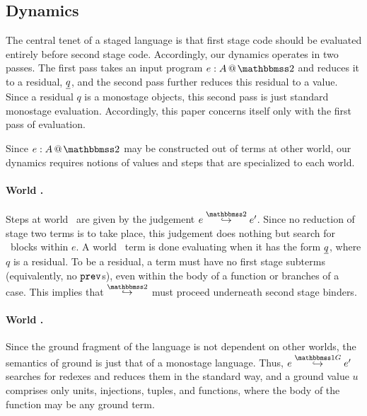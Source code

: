 \subsection{Dynamics}
\label{sec:dynamics}



The central tenet of a staged language
is that first stage code should be evaluated entirely before second stage code.
Accordingly, our dynamics operates in two passes.
The first pass takes an input program $\coltwo e A$ and reduces it to a residual,
$\underline{q}$, and the second pass further reduces this residual to a value.
Since a residual $q$ is a monostage objects, this second pass is just standard monostage evaluation.
Accordingly, this paper concerns itself only with the first pass of evaluation.

Since $\coltwo e A$ may be constructed out of terms at other world, 
our dynamics requires notions of values and steps that are specialized to each world.

\paragraph{World \bbtwo.} Steps at world \bbtwo\ are given by the judgement $\steptwo e {e'}$.
Since no reduction of stage two terms is to take place, this judgement does nothing but search for \prev\ blocks within $e$.
A world \bbtwo\ term is done evaluating when it has the form $\underline{q}$, where $q$ is a residual. 
To be a residual, a term must have no first stage subterms (equivalently, no ${\tt prev}$s), even within the body of a function or branches of a case.
This implies that $\stepsym \bbtwo$ must proceed underneath second stage binders.

\paragraph{World \bbonep.} Since the ground fragment of the language is not dependent on other worlds, the semantics of ground is just that of a monostage language.
Thus, $\steppure e {e'}$ searches for redexes and reduces them in the standard way, and a ground value $u$ comprises only units, injections, tuples, and functions, where the body of the function may be any ground term.

